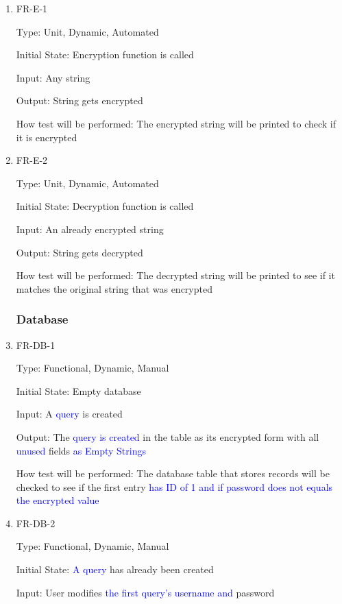 \documentclass[12pt, titlepage]{article}
\begin{document}
\begin{enumerate}
\item{FR-E-1\\}

Type: Unit, Dynamic, Automated

Initial State: Encryption function is called

Input: Any string

Output: String gets encrypted

How test will be performed: The encrypted string will be printed to check if it is encrypted

\item{FR-E-2\\}

Type: Unit, Dynamic, Automated

Initial State: Decryption function is called

Input: An already encrypted string

Output: String gets decrypted

How test will be performed: The decrypted string will be printed to see if it matches the original string that was encrypted

\subsubsection{Database}

\item{FR-DB-1\\}

Type: Functional, Dynamic, Manual

Initial State: Empty database

Input: A \textcolor{blue}{query} is created

Output: The \textcolor{blue}{query is created} in the table as its encrypted form with all \textcolor{blue}{unused} fields \textcolor{blue}{as Empty Strings}

How test will be performed: The database table that stores records will be checked to see if the first entry \textcolor{blue}{has ID of 1 and if password does not equals the encrypted value}

\item{FR-DB-2\\}

Type: Functional, Dynamic, Manual

Initial State: \textcolor{blue}{A query} has already been created

Input: User modifies \textcolor{blue}{the first query's username and} password


\end{enumerate}
\end{document}
